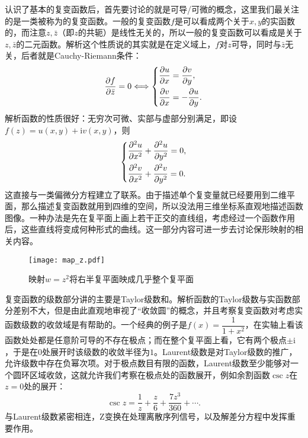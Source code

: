 认识了基本的复变函数后，首先要讨论的就是可导/可微的概念，这里我们最关注的是一类被称为的复变函数。一般的复变函数$f$是可以看成两个关于$x,y$的实函数的，而注意$z,\bar{z}$（即$z$的共轭）是线性无关的，所以一般的复变函数可以看成是关于$z,\bar{z}$的二元函数。解析这个性质说的其实就是在定义域上，$f$对$z$可导，同时与$\bar{z}$无关，后者就是Cauchy-Riemann条件：
\begin{align*}
    \frac{\partial f}{\partial \bar{z}}=0 \Longleftrightarrow
    \begin{dcases}
        \dfrac{\partial u}{\partial x}=\dfrac{\partial v}{\partial y},  \\
        \dfrac{\partial v}{\partial x}=-\dfrac{\partial u}{\partial y}. \\
    \end{dcases}
\end{align*}
解析函数的性质很好：无穷次可微、实部与虚部分别满足，即设$f(z)=u(x,y)+\mathrm{i}v(x,y)$，则
\begin{align*}
    \begin{dcases}
        \dfrac{\partial ^2u}{\partial x^2}+\dfrac{\partial ^2u}{\partial y^2}=0, \\
        \dfrac{\partial ^2v}{\partial x^2}+\dfrac{\partial ^2v}{\partial y^2}=0. \\
    \end{dcases}
\end{align*}
这直接与一类偏微分方程建立了联系。由于描述单个复变量就已经要用到二维平面，那么描述复变函数就用到四维的空间，所以没法用三维坐标系直观地描述函数图像。一种办法是先在复平面上画上若干正交的直线组，考虑经过一个函数作用后，这些直线将变成何种形式的曲线。这一部分内容可进一步去讨论保形映射的相关内容。

\begin{figure}[h]
    \centering
    \texttt{[image: map\_z.pdf]}
    \caption{映射$w=z^2$将右半复平面映成几乎整个复平面}
\end{figure}


复变函数的级数部分讲的主要是Taylor级数和。解析函数的Taylor级数与实函数部分差别不大，但是由此直观地审视了“收敛圆”的概念，并且考察复变函数对考虑实函数级数的收敛域是有帮助的。一个经典的例子是$f(x)=\dfrac{1}{1+x^2}$，在实轴上看该函数处处都是任意阶可导的不存在极点；而在整个复平面上看，它有两个极点$\pm\mathrm{i}$，于是在$0$处展开时该级数的收敛半径为$1$。Laurent级数是对Taylor级数的推广，允许级数中存在负幂次项。对于极点数目有限的函数，Laurent级数至少能够对一个圆环区域收敛，这就允许我们考察在极点处的函数展开，例如余割函数$\csc z$在$z=0$处的展开：
\[
    \csc z=\frac{1}{z}+\frac{z}{6}+\frac{7z^3}{360}+\cdots
    .\]
与Laurent级数紧密相连，Z变换在处理离散序列信号，以及解差分方程中发挥重要作用。

